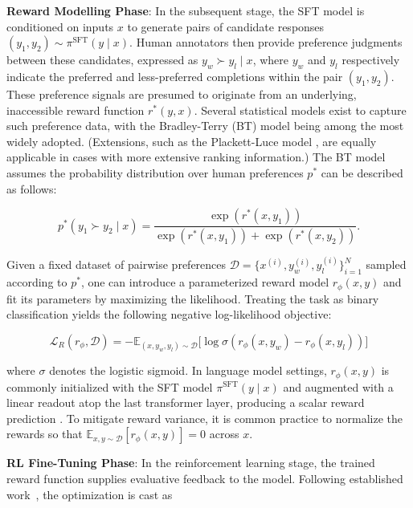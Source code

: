 \textbf{Reward Modelling Phase}: In the subsequent stage, the SFT model is conditioned on inputs $x$ to generate pairs of candidate responses $(y_1, y_2)\sim \pi^\text{SFT}(y \mid x)$. Human annotators then provide preference judgments between these candidates, expressed as $y_w\succ y_l \mid x$, where $y_w$ and $y_l$ respectively indicate the preferred and less-preferred completions within the pair $(y_1, y_2)$. These preference signals are presumed to originate from an underlying, inaccessible reward function $r^*(y, x)$. Several statistical models exist to capture such preference data, with the Bradley-Terry (BT) model \cite{bradley1952rankanalysis} being among the most widely adopted. (Extensions, such as the Plackett-Luce model \citep{plackett1975analysis, luce2012individual}, are equally applicable in cases with more extensive ranking information.) The BT model assumes the probability distribution over human preferences $p^*$ can be described as follows:

\begin{equation}\label{eq:bradley-terry}
    p^*(y_1\succ y_2 \mid x)=\frac{\exp\left(r^*(x, y_1)\right)}{\exp\left(r^*(x, y_1)\right) + \exp\left(r^*(x, y_2)\right)}.
\end{equation}

Given a fixed dataset of pairwise preferences $\mathcal{D}=\bigl\{x^{(i)}, y_w^{(i)}, y_l^{(i)}\bigr\}_{i=1}^N$ sampled according to $p^*$, one can introduce a parameterized reward model $r_{\phi}(x, y)$ and fit its parameters by maximizing the likelihood. Treating the task as binary classification yields the following negative log-likelihood objective:

\begin{equation}\label{eq:reward_model}
    \mathcal{L}_R(r_{\phi}, \mathcal{D}) = -\mathbb{E}_{(x, y_w, y_l)\sim \mathcal{D}}\bigl[\log \sigma(r_{\phi}(x, y_w)- r_{\phi}(x, y_l))\bigr]
\end{equation}

where $\sigma$ denotes the logistic sigmoid. In language model settings, $r_{\phi}(x, y)$ is commonly initialized with the SFT model $\pi^\text{SFT}(y \mid x)$ and augmented with a linear readout atop the last transformer layer, producing a scalar reward prediction \cite{ziegler2020finetuning}. To mitigate reward variance, it is common practice to normalize the rewards so that $\mathbb{E}_{x,y\sim \mathcal{D}}\left[r_\phi(x, y)\right] = 0$ across $x$.

\textbf{RL Fine-Tuning Phase}: In the reinforcement learning stage, the trained reward function supplies evaluative feedback to the model. Following established work~\citep{jaques2017sequence, jaques2020human}, the optimization is cast as

